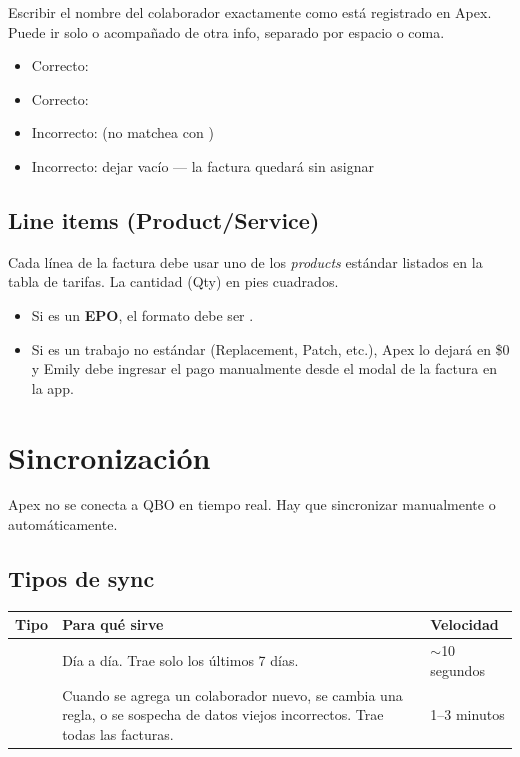 \documentclass[11pt,a4paper]{article}
\begin{document}
Escribir el nombre del colaborador exactamente como está registrado en Apex. Puede ir solo o acompañado de otra info, separado por espacio o coma.

\begin{itemize}
  \item Correcto: 
  \item Correcto: 
  \item Incorrecto:  (no matchea con )
  \item Incorrecto: dejar vacío --- la factura quedará sin asignar
\end{itemize}

\subsection{Line items (Product/Service)}

Cada línea de la factura debe usar uno de los \textit{products} estándar listados en la tabla de tarifas. La cantidad (Qty) en pies cuadrados.

\begin{itemize}
  \item Si es un \textbf{EPO}, el formato debe ser .
  \item Si es un trabajo no estándar (Replacement, Patch, etc.), Apex lo dejará en \$0 y Emily debe ingresar el pago manualmente desde el modal de la factura en la app.
\end{itemize}

\section{Sincronización}

Apex no se conecta a QBO en tiempo real. Hay que sincronizar manualmente o automáticamente.

\subsection{Tipos de sync}

\begin{center}
\begin{tabularx}{\linewidth}{L{3.5cm} X L{2.5cm}}
\toprule
\textbf{Tipo} & \textbf{Para qué sirve} & \textbf{Velocidad} \\
\midrule
{} & Día a día. Trae solo los últimos 7 días. & $\sim$10 segundos \\
       & Cuando se agrega un colaborador nuevo, se cambia una regla, o se sospecha de datos viejos incorrectos. Trae todas las facturas. & 1--3 minutos \\
\bottomrule
\end{tabularx}
\end{center}
\end{document}
